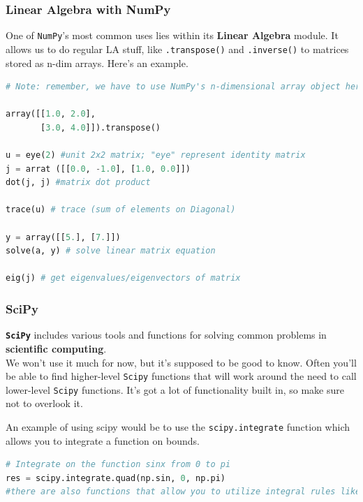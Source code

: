 \documentclass[english, 10pt]{article}
\begin{document}
\subsubsection{Linear Algebra with NumPy}

One of \texttt{NumPy}'s most common uses lies within its \textbf{Linear Algebra} module. It allows us to do regular LA stuff, like \texttt{.transpose()} and \texttt{.inverse()} to matrices stored as n-dim arrays. Here's an example.

{\centering
\begin{lstlisting}[language=python]
# Note: remember, we have to use NumPy's n-dimensional array object here

array([[1.0, 2.0],
       [3.0, 4.0]]).transpose()

u = eye(2) #unit 2x2 matrix; "eye" represent identity matrix
j = arrat ([[0.0, -1.0], [1.0, 0.0]])
dot(j, j) #matrix dot product

trace(u) # trace (sum of elements on Diagonal)

y = array([[5.], [7.]])
solve(a, y) # solve linear matrix equation

eig(j) # get eigenvalues/eigenvectors of matrix
\end{lstlisting}
}

\subsubsection{SciPy}

\textbf{\texttt{SciPy}} includes various tools and functions for solving common problems in \textbf{scientific computing}.\\

We won't use it much for now, but it's supposed to be good to know. Often you'll be able to find higher-level \texttt{Scipy} functions that will work around the need to call lower-level \texttt{Scipy} functions. It's got a lot of functionality built in, so make sure not to overlook it. \newline\newline

An example of using scipy would be to use the \texttt{scipy.integrate} function which allows you to integrate a function on bounds. 
{\centering
\begin{lstlisting}[language=python]
# Integrate on the function sinx from 0 to pi
res = scipy.integrate.quad(np.sin, 0, np.pi)
#there are also functions that allow you to utilize integral rules like trapezoidal rule. 
\end{lstlisting}
}
\end{document}
